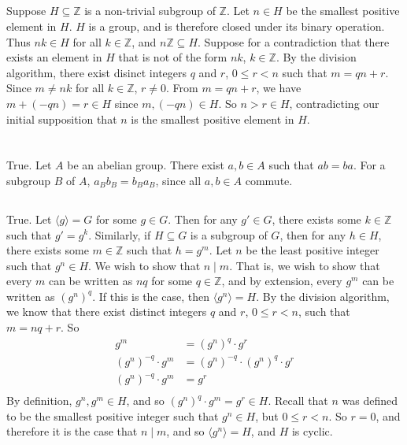 \documentclass{article}
\begin{document}
\subsection{} %
Suppose $H\subseteq\mathbb{Z}$ is a non-trivial subgroup of $\mathbb{Z}$. Let
$n\in H$ be the smallest positive element in $H$. $H$ is a group, and is
therefore closed under its binary operation. Thus $nk\in H$ for all
$k\in\mathbb{Z}$, and  $n\mathbb{Z}\subseteq H$.
Suppose for a contradiction that there exists an element in $H$ that is not of
the form $nk$, $k\in\mathbb{Z}$. By the division algorithm, there exist disinct
integers $q$ and $r$, $0\le r<n$ such that $m=qn+r$. Since $m\neq nk$ for all
$k\in\mathbb{Z}$, $r\neq0$. From $m=qn+r$, we have $m+(-qn)=r\in H$ since
$m,(-qn)\in H$. So $n>r\in H$, contradicting our initial supposition that $n$
is the smallest positive element in $H$.
\section{} %
\renewcommand{\thesubsection}{\thesection.\roman{subsection}}
\subsection{} %
True. Let $A$ be an abelian group. There exist $a,b\in A$ such that $ab=ba$.
For a subgroup $B$ of $A$, $a_B b_B=b_B a_B$, since all $a,b\in A$ commute.
\subsection{} %
True. Let $\langle g\rangle=G$ for some $g\in G$. Then for any $g'\in G$, there
exists some $k\in\mathbb{Z}$ such that $g'=g^k$. Similarly, if $H\subseteq G$
is a subgroup of $G$, then for any $h\in H$, there exists some $m\in\mathbb{Z}$
such that $h=g^m$.
\newline
Let $n$ be the least positive integer such that $g^n\in H$. We wish to show
that $n\mid m$. That is, we wish to show that every $m$ can be written as $nq$
for some $q\in\mathbb{Z}$, and by extension, every $g^m$ can be written as
$(g^n)^q$. If this is the case, then $\langle g^n\rangle=H$.
\newline
By the division algorithm, we know that there exist distinct integers $q$ and
$r$, $0\le r<n$, such that $m=nq+r$. So
\begin{align*}
	g^m&=(g^n)^q\cdot g^r\\
	(g^n)^{-q}\cdot g^m&=(g^n)^{-q}\cdot(g^n)^q\cdot g^r\\
	(g^n)^{-q}\cdot g^m&=g^r\\
\end{align*}
By definition, $g^n,g^m\in H$, and so $(g^n)^q\cdot g^m=g^r\in H$. Recall
that $n$ was defined to be the smallest positive integer such that $g^n\in H$,
but $0\le r<n$. So $r=0$, and therefore it is the case that $n\mid m$, and so
$\langle g^n\rangle=H$, and $H$ is cyclic.
\end{document}

